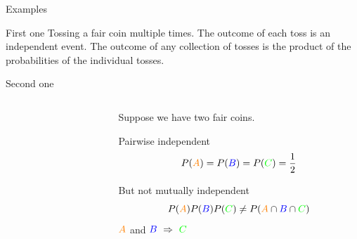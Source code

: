 \documentclass[fullscreen=true, bookmarks=true, hyperref={pdfencoding=unicode}]{beamer}
\begin{document}
\begin{frame}{Examples}
  \begin{block}{First one}
    Tossing a fair coin multiple times. The outcome of each toss is 
    an independent event. The outcome of any collection of tosses 
    is the product of the probabilities of the individual tosses. 
  \end{block}

  \pause
  \begin{block}{Second one}
    \begin{columns}
      \begin{column}{0.5\textwidth}
      \end{column}
      \begin{column}{0.5\textwidth}
        Suppose we have two fair coins. 
        
        \pause Pairwise independent 
        $$ P({\color{orange}A}) = P({\color{blue}B}) = P({\color{green}C}) = \frac{1}{2}$$        

        \pause But not mutually independent
        $$ P({\color{orange}A}) P({\color{blue}B}) P({\color{green}C}) \neq 
           P({\color{orange}A} \cap {\color{blue}B} \cap {\color{green}C}) $$
        \pause ${\color{orange}A}$ and ${\color{blue}B}\ \Rightarrow\ {\color{green}C}$
      \end{column}
    \end{columns}
  \end{block}
\end{frame}
\end{document}
